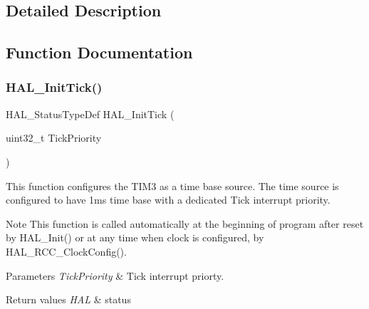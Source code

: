 \subsection{Detailed Description}


\subsection{Function Documentation}
\hypertarget{group___h_a_l___time_base_ga879cdb21ef051eb81ec51c18147397d5}{}\label{group___h_a_l___time_base_ga879cdb21ef051eb81ec51c18147397d5} 
\subsubsection{\texorpdfstring{H\+A\+L\+\_\+\+Init\+Tick()}{HAL\_InitTick()}}
{\footnotesize\ttfamily H\+A\+L\+\_\+\+Status\+Type\+Def H\+A\+L\+\_\+\+Init\+Tick (\begin{DoxyParamCaption}\item[{uint32\+\_\+t}]{Tick\+Priority }\end{DoxyParamCaption})}



This function configures the T\+I\+M3 as a time base source. The time source is configured to have 1ms time base with a dedicated Tick interrupt priority. 

\begin{DoxyNote}{Note}
This function is called automatically at the beginning of program after reset by H\+A\+L\+\_\+\+Init() or at any time when clock is configured, by H\+A\+L\+\_\+\+R\+C\+C\+\_\+\+Clock\+Config(). 
\end{DoxyNote}

\begin{DoxyParams}{Parameters}
{\em Tick\+Priority} & Tick interrupt priorty. \\
\hline
\end{DoxyParams}

\begin{DoxyRetVals}{Return values}
{\em H\+AL} & status \\
\hline
\end{DoxyRetVals}
\hypertarget{group___h_a_l___time_base_ga24e0ee9dae1ec0f9d19200f5575ff790}{}\label{group___h_a_l___time_base_ga24e0ee9dae1ec0f9d19200f5575ff790} 
